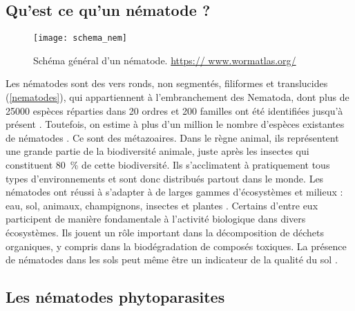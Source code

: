 \subsection{Qu'est ce qu’un nématode ?}
	
\begin{figure}[h]
  \centering \texttt{[image: schema\_nem]}
	  \caption[Schéma général d’un nématode]{Schéma général d’un nématode. \href{https://www.wormatlas.org/}{https://  
	  www.wormatlas.org/}}
	  \label{nematodes}
\end{figure}
	
	Les nématodes sont des vers ronds, non segmentés, filiformes et translucides (\autoref{nematodes}), qui appartiennent à l'embranchement des Nematoda, dont plus de 25000 espèces réparties  dans 20 ordres et 200 familles ont été identifiées jusqu'à présent \citep{Abad2008}.  Toutefois, on estime à plus d’un million le nombre d’espèces existantes de nématodes \citep{Hugot2001}. Ce sont des métazoaires. %
Dans le règne animal, ils représentent une grande partie de la biodiversité animale, juste après les insectes  qui constituent 80~\% de cette biodiversité. 
Ils s'acclimatent à pratiquement tous types d'environnements et sont donc distribués partout dans le monde. Les nématodes  ont réussi à s'adapter à de larges gammes d'écosystèmes et milieux : eau, sol, animaux, champignons, insectes et  plantes \citep{Bongers1998}. Certains d'entre eux participent de manière fondamentale à l'activité biologique dans divers écosystèmes. Ils jouent un rôle important dans la décomposition de déchets organiques, y compris dans la biodégradation de composés toxiques. La présence de nématodes dans les sols peut  même être un indicateur de la qualité du sol \citep{Yeates1987}.


\subsection{Les nématodes phytoparasites}
	
